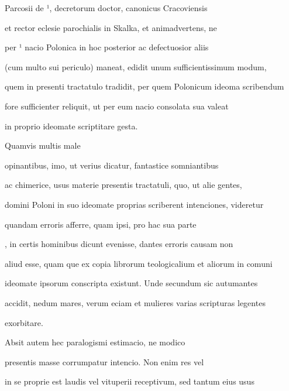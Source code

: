 \newpage
{}

Parcosii de ¹, decretorum doctor, canonicus Cracoviensis

et rector eclesie parochialis in Skalka, et animadvertens, ne 

 per ¹ nacio Polonica in hoc posterior ac defectuosior aliis

(cum multo sui periculo) maneat, edidit unum sufficientissimum modum,

quem in presenti tractatulo tradidit, per quem Polonicum ideoma scribendum

fore sufficienter reliquit, ut per eum nacio consolata sua valeat

\splitlines{}

in proprio ideomate scriptitare gesta.

\indentP Quamvis multis male

\fulllines{}

opinantibus, imo, ut verius dicatur, fantastice somniantibus

ac chimerice, usus materie presentis tractatuli, quo, ut alie gentes,

domini Poloni in suo ideomate proprias scriberent intenciones, videretur 

 quandam erroris afferre, quam ipsi, pro hac sua parte 

, in certis hominibus dicunt evenisse, dantes erroris causam non

aliud esse, quam que ex copia librorum teologicalium et aliorum in comuni

ideomate ipsorum conscripta existunt. Unde secundum sic autumantes

accidit, nedum mares, verum eciam et mulieres varias scripturas legentes

\splitlines{}

exorbitare.

\indentK Absit autem hec paralogismi estimacio, ne modico 

\fulllines{}

 presentis masse corrumpatur intencio. Non enim res vel 

 in se proprie est laudis vel vituperii receptivum, sed tantum eius usus

